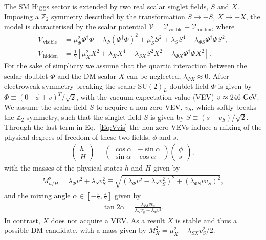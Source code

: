 \documentclass[../report.tex]{subfiles}
\begin{document}
The SM Higgs sector is extended by two real scalar singlet fields, $S$ and $X$. Imposing a $\mathbb{Z}_2$ symmetry described by the transformation $S\to -S$, $X\to -X$, the model is characterised by the scalar potential $\mathcal{V} = \mathcal{V}_\mathrm{visible}  + \mathcal{V}_\mathrm{hidden}$, where
\begin{align}
\label{Eq:Vvis}\mathcal{V}_\mathrm{visible} &=   \mu_{\Phi}^2 \Phi^\dagger \Phi + \lambda_\Phi (\Phi^\dagger \Phi)^2 + \mu_S^2 S^2 + \lambda_S S^4 + \lambda_{\Phi S} \Phi^\dagger \Phi S^2,\\
\label{Eq:Vhid} \mathcal{V}_\mathrm{hidden} &= \frac{1}{2}\left[\mu^2_{X} X^2 + \lambda_X X^4 + \lambda_{SX} S^2 X^2 + \lambda_{\Phi X} \Phi^\dagger \Phi X^2\right]. 
\end{align}
For the sake of simplicity we assume that the quartic interaction between the scalar doublet $\Phi$ and the DM scalar $X$ can be neglected, $\lambda_{\Phi X} \approx 0$. After electroweak symmetry breaking the scalar $\mathrm{SU}(2)_L$ doublet field $\Phi$ is given by 
$\Phi \equiv \left(0 \quad \phi + v\right)^T/\sqrt{2}$, with the vacuum expectation value (VEV) $v \approx 246~\text{GeV}$. 
We assume the scalar field $S$ to acquire a non-zero VEV, $v_S$, which softly breaks the $\mathbb{Z}_2$ symmetry, such that the singlet field $S$ is given by $S \equiv (s + v_S)/\sqrt{2}$. Through the last term in Eq.~\eqref{Eq:Vvis} the non-zero VEVs induce a mixing of the physical degrees of freedom of these two fields, $\phi$ and $s$,
\begin{align}
\begin{pmatrix} h \\ H \end{pmatrix} = \begin{pmatrix} \cos \alpha & -\sin\alpha \\ \sin\alpha & \cos\alpha \end{pmatrix} \begin{pmatrix} \phi \\ s \end{pmatrix},
\end{align}
with the masses of the physical states $h$ and $H$ given by
\begin{align}
M_{h/H}^2 = \lambda_\Phi v^2 + \lambda_S v_S^2 \mp \sqrt{\left(\lambda_\Phi v^2 - \lambda_S v_S^2\right)^2 + \left(\lambda_{\Phi S} v v_S\right)^2},
\end{align}
and the mixing angle $\alpha \in [-\tfrac{\pi}{2}, \tfrac{\pi}{2}]$ given by
\begin{align}
\tan 2\alpha = \frac{\lambda_{\Phi S} v v_s}{\lambda_S v_S^2 - \lambda_\Phi v^2}.
\end{align}
In contrast, $X$ does not acquire a VEV. As a result $X$ is stable and thus a possible DM candidate, with a mass given by
$M_X^2  = \mu_X^2  + \lambda_{SX} v_S^2/2$.
\end{document}
